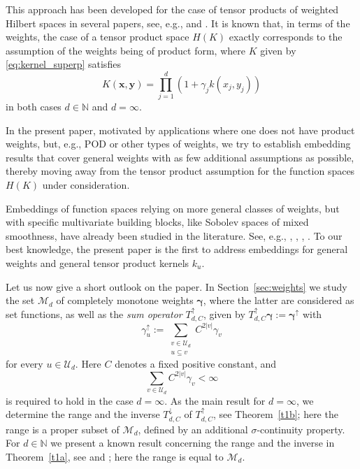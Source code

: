 \documentclass{article}
\newcommand{\N}  {{\mathbb N}}
\newcommand{\bx}{{\mathbf x}}
\newcommand{\by}{{\mathbf y}}
\newcommand{\bg}{{\boldsymbol{\gamma}}}
\newcommand{\U}  {\mathcal{U}}
\newcommand{\M}  {\mathcal{M}}
\newcommand{\lo}{\downarrow}
\newcommand{\up}{\uparrow}
\theoremstyle{plain}
\theoremstyle{definition}
\begin{document}
This approach has been developed for the case of 
tensor products of weighted Hilbert spaces
in several papers, see, e.g., 
\citet{HR13} and \citet{GHHR17}. It is known that, in terms of the 
weights, the case of a tensor product space $H(K)$
exactly corresponds to the 
assumption of the weights being of product form,
where $K$ given by \eqref{eq:kernel_superp} satisfies
\begin{equation}\label{g17}
K(\bx,\by) = \prod_{j=1}^d (1 + \gamma_j k(x_j,y_j))
\end{equation}
in both cases $d\in\N$ and $d = \infty$. 

In the present paper, 
motivated by applications where one 
does not have product weights, 
but, e.g., POD or other types of weights, we try to 
establish embedding results that cover general weights with as 
few additional assumptions 
as possible, thereby moving away from the tensor product 
assumption for the function spaces $H(K)$ under consideration. 


Embeddings of function spaces relying on more general classes 
of weights, but with specific multivariate building blocks,
like Sobolev spaces  of mixed smoothness, 
have already been studied in the literature. See,
e.g., 
\citet{Hefter20161}, \citet{Hinrichs2015}, \citet{GHHRW2017}, 
\citet{GKS2022}.
To our best knowledge, the present paper is the first to address 
embeddings for 
general weights and general tensor product kernels $k_u$.

Let us now give a short outlook on the paper. 
In Section~\ref{sec:weights} we study 
the set $\M_d$ of completely monotone weights $\bg$,
where the latter are considered as set functions,
as well as the \emph{sum operator} $T_{d, C}^\up$, 
given by $T_{d, C}^\up \bg := \bg^\up$ with
\[
\gamma^\up_u :=
\sum_{\substack{v\in \U_d \\ u\subseteq v}}
C^{2\left|v\right|}\gamma_v
\]
for every $u \in \U_d$. Here $C$ denotes a fixed positive 
constant, and \begin{equation}\label{g11}
\sum_{v\in \U_d} C^{2\left|v\right|}\gamma_v < \infty
\end{equation}
is required to hold in the case $d = \infty$. As the main result
for $d=\infty$, we determine the range and the inverse $T^\lo_{d, C}$
of $T^\up_{d, C}$, see Theorem~\ref{t1b};
here the range is a proper subset of $\M_d$, defined by an 
additional $\sigma$-continuity property.
For $d \in \N$ we present a known result concerning the 
range and the inverse in Theorem~\ref{t1a}, see 
\citet{Aigner79} and \citet{Matus94}; 
here the range is equal to $\M_d$.
\end{document}
